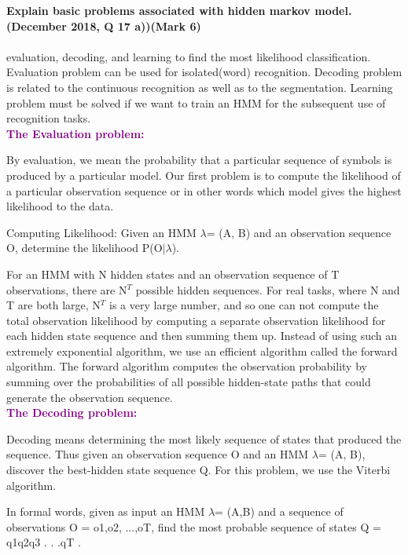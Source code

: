 
\textbf{\textcolor{LightMagenta}{Explain basic problems associated with hidden markov model. (December 2018, Q 17 a))\hfill (Mark 6)}} \\[5pt]
 \\ {evaluation, decoding, and learning to find the most likelihood classification. Evaluation problem can be used for isolated(word) recognition. Decoding problem is related to the continuous recognition as well as to the segmentation. Learning problem must be solved if we want to train an HMM for the subsequent use of recognition tasks.
} \\

\textbf{\textcolor{purple}{The Evaluation problem:} }

By evaluation, we mean the probability that a particular sequence of symbols is produced by a particular model. Our first problem is to compute the likelihood of a particular observation sequence or in other words which model gives the highest likelihood to the data.

Computing Likelihood: Given an HMM $\lambda$= (A, B) and an observation sequence O, determine the likelihood P(O$|\lambda$). 

For an HMM with N hidden states and an observation sequence of T observations, there are N$^T$ possible hidden sequences. For real tasks, where N and T are both large, N$^T$ is a very large number, and so one can not compute the total observation likelihood by computing a separate observation likelihood for each hidden state sequence and then summing them up. 
Instead of using such an extremely exponential algorithm, we use an efficient algorithm called the forward algorithm. The forward algorithm computes the observation probability by summing over the probabilities of all possible hidden-state paths that could generate the observation sequence. \\

\textbf{\textcolor{purple}{The Decoding problem:} } 
    
Decoding means determining the most likely sequence of states that produced the sequence. Thus given an observation sequence O and an HMM  $\lambda$= (A, B), discover the best-hidden state sequence Q. For this problem, we use the Viterbi algorithm.

In formal words, given as input an HMM  $\lambda$= (A,B) and a sequence of observations O = o1,o2, ...,oT, find the most probable sequence of states Q = q1q2q3 . . .qT . 

